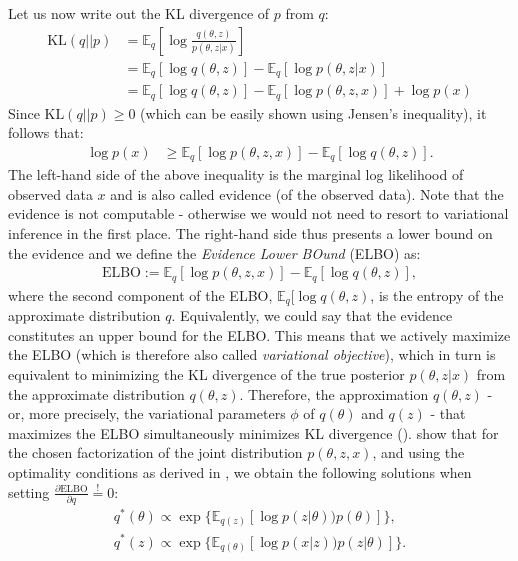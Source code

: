 Let us now write out the KL divergence of $p$ from $q$:
\begin{align*}
\text{KL}(q||p) &= \mathbb{E}_q[\log\frac{q(\theta,z)}{p(\theta,z|x)}] \\
&= \mathbb{E}_q[\log q(\theta,z)] - \mathbb{E}_q[\log p(\theta,z|x)] \\
&=\mathbb{E}_q[\log q(\theta,z)] - \mathbb{E}_q[\log p(\theta,z,x)] + \log p(x) 
\end{align*}
Since $\text{KL}(q||p) \geq 0$ (which can be easily shown using Jensen's inequality), it follows that:
\begin{align*}
\log p(x) & \geq \mathbb{E}_q[\log p(\theta,z,x)] - \mathbb{E}_q[\log q(\theta,z)].
\end{align*}
The left-hand side of the above inequality is the marginal log likelihood of observed data $x$ and is also called evidence (of the observed data). Note that the evidence is not computable - otherwise we would not need to resort to variational inference in the first place. The right-hand side thus presents a lower bound on the evidence and we define the \textit{Evidence Lower BOund} (ELBO) as:
\begin{align*}
\text{ELBO} := \mathbb{E}_q[\log p(\theta,z,x)] - \mathbb{E}_q[\log q(\theta,z)],
\end{align*}
where the second component of the ELBO, $\mathbb{E}_q[\log q(\theta,z)$, is the entropy of the approximate distribution $q$. Equivalently, we could say that the evidence constitutes an upper bound for the ELBO. This means that we actively maximize the ELBO (which is therefore also called \textit{variational objective}), which in turn is equivalent to minimizing the KL divergence of the true posterior $p(\theta,z|x)$ from the approximate distribution $q(\theta,z)$. Therefore, the approximation $q(\theta,z)$ - or, more precisely, the variational parameters $\phi$ of $q(\theta)$ and $q(z)$ - that maximizes the ELBO simultaneously minimizes KL divergence (\citealp{blei2003latent, wang2013variational}). \cite{wang2013variational} show that for the chosen factorization of the joint distribution $p(\theta,z,x)$, and using the optimality conditions as derived in \cite{bishop2006pattern}, we obtain the following solutions when setting $\frac{\partial \text{ELBO}}{\partial q}\overset{!}{=}0$:
\begin{align*}
q^{*}(\theta) \propto \exp\{\mathbb{E}_{q(z)}[\log p(z|\theta))p(\theta)]\}, \\
q^{*}(z) \propto \exp\{\mathbb{E}_{q(\theta)}[\log p(x|z))p(z|\theta)]\}.
\end{align*}
